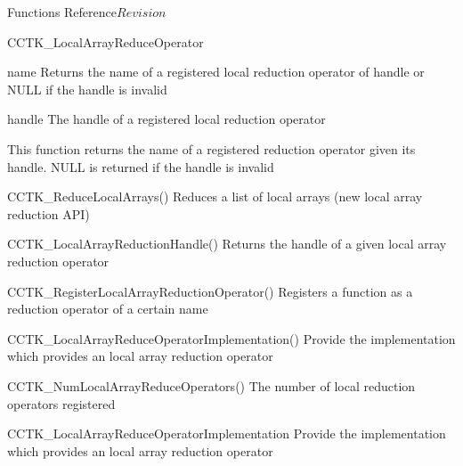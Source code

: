 \begin{cactuspart}{ Functions Reference}{}{$Revision$}
\begin{FunctionDescription}{CCTK\_LocalArrayReduceOperator}
\begin{ResultSection}
\begin{Result}{name}
Returns the name of a registered local reduction operator of handle \newline {}
or NULL if the handle is invalid
\end{Result}
\end{ResultSection}

\begin{ParameterSection}
\begin{Parameter}{handle}
The handle of a registered local reduction operator
\end{Parameter}
\end{ParameterSection}

\begin{Discussion}
This function returns the name of a registered reduction operator given
its handle. NULL is returned if the handle is invalid
\end{Discussion}

\begin{SeeAlsoSection}
\begin{SeeAlso}{CCTK\_ReduceLocalArrays()}
Reduces a list of local arrays (new local array reduction API)
\end{SeeAlso}

\begin{SeeAlso}{CCTK\_LocalArrayReductionHandle()}
Returns the handle of a given local array reduction operator
\end{SeeAlso}

\begin{SeeAlso}{CCTK\_RegisterLocalArrayReductionOperator()}
Registers a function as a reduction operator of a certain name
\end{SeeAlso}

\begin{SeeAlso}{CCTK\_LocalArrayReduceOperatorImplementation()}
Provide the implementation which provides an local array reduction operator
\end{SeeAlso}

\begin{SeeAlso}{CCTK\_NumLocalArrayReduceOperators()}
The number of local reduction operators registered
\end{SeeAlso}
\end{SeeAlsoSection}
\end{FunctionDescription}

\begin{FunctionDescription}{CCTK\_LocalArrayReduceOperatorImplementation}
\label{CCTK-LocalArrayReduceOperatorImplementation}
Provide the implementation which provides an local array reduction operator


\end{FunctionDescription}
\end{cactuspart}
